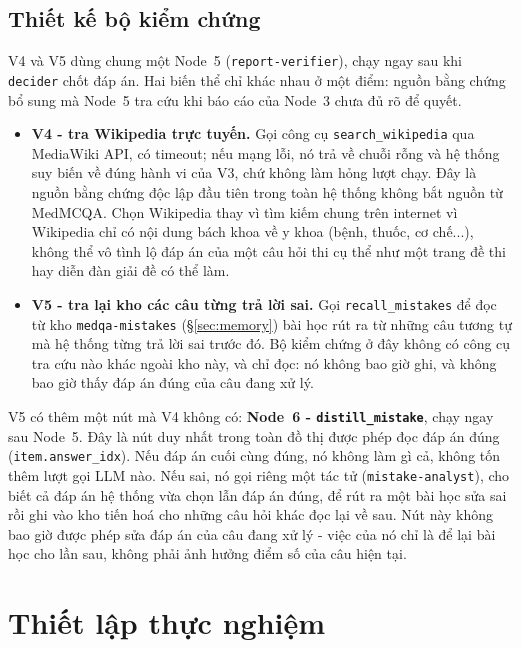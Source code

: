 \documentclass[11pt]{article}
\begin{document}
\subsection{Thiết kế bộ kiểm chứng}
\label{sec:verifier}
V4 và V5 dùng chung một Node~5 (\texttt{report-verifier}), chạy ngay sau khi \texttt{decider} chốt
đáp án. Hai biến thể chỉ khác nhau ở một điểm: nguồn bằng chứng bổ sung mà Node~5 tra cứu khi báo cáo của
Node~3 chưa đủ rõ để quyết.
\begin{itemize}[nosep]
  \item \textbf{V4 - tra Wikipedia trực tuyến.} Gọi công cụ \texttt{search\_wikipedia} qua MediaWiki
  API, có timeout; nếu mạng lỗi, nó trả về chuỗi rỗng và hệ thống suy biến về đúng hành vi của V3, chứ
  không làm hỏng lượt chạy. Đây là nguồn bằng chứng độc lập đầu tiên trong toàn hệ thống không bắt
  nguồn từ MedMCQA. Chọn Wikipedia thay vì tìm kiếm chung trên internet vì Wikipedia
  chỉ có nội dung bách khoa về y khoa (bệnh, thuốc, cơ chế...), không thể vô tình lộ đáp án của một câu
  hỏi thi cụ thể như một trang đề thi hay diễn đàn giải đề có thể làm.
  \item \textbf{V5 - tra lại kho các câu từng trả lời sai.} Gọi \texttt{recall\_mistakes} để đọc từ kho
  \texttt{medqa-mistakes} (\S\ref{sec:memory}) bài học rút ra từ những câu tương tự mà hệ thống từng
  trả lời sai trước đó. Bộ kiểm chứng ở đây không có công cụ tra cứu nào khác ngoài kho này, và chỉ
  đọc: nó không bao giờ ghi, và không bao giờ thấy đáp án đúng của câu đang xử lý.
\end{itemize}

V5 có thêm một nút mà V4 không có: \textbf{Node~6 - \texttt{distill\_mistake}}, chạy ngay sau Node~5.
Đây là nút duy nhất trong toàn đồ thị được phép đọc đáp án đúng (\texttt{item.answer\_idx}). Nếu đáp án
cuối cùng đúng, nó không làm gì cả, không tốn thêm lượt gọi LLM nào. Nếu sai, nó gọi riêng một tác tử
(\texttt{mistake-analyst}), cho biết cả đáp án hệ thống vừa chọn lẫn đáp án đúng, để rút ra một bài học
sửa sai rồi ghi vào kho tiến hoá cho những câu hỏi khác đọc lại về sau. Nút này không bao giờ được phép
sửa đáp án của câu đang xử lý - việc của nó chỉ là để lại bài học cho lần sau, không phải ảnh hưởng
điểm số của câu hiện tại.

\FloatBarrier
\section{Thiết lập thực nghiệm}
\label{sec:setup}
\end{document}
